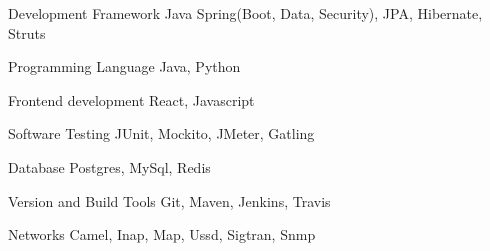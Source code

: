 

\begin{cvskills}

  \cvskill
    {Development Framework} %
    {Java Spring(Boot, Data, Security), JPA, Hibernate, Struts} %

  \cvskill
    {Programming Language} %
    {Java, Python} %

  \cvskill
    {Frontend development} %
    {React, Javascript} %

  \cvskill
    {Software Testing} %
    {JUnit, Mockito, JMeter, Gatling} %
    
  \cvskill
    {Database} %
    {Postgres, MySql, Redis} %
    
  \cvskill
    {Version and Build Tools} %
    {Git, Maven, Jenkins, Travis} %
    
  \cvskill
    {Networks} %
    {Camel, Inap, Map, Ussd, Sigtran, Snmp} %


\end{cvskills}
